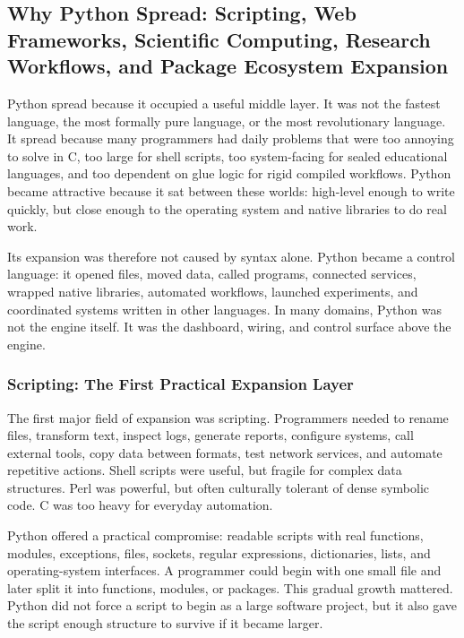 \subsection{Why Python Spread: Scripting, Web Frameworks, Scientific Computing, Research Workflows, and Package Ecosystem Expansion}

Python spread because it occupied a useful middle layer. It was not the fastest language, the most formally pure language, or the most revolutionary language. It spread because many programmers had daily problems that were too annoying to solve in C, too large for shell scripts, too system-facing for sealed educational languages, and too dependent on glue logic for rigid compiled workflows. Python became attractive because it sat between these worlds: high-level enough to write quickly, but close enough to the operating system and native libraries to do real work.

Its expansion was therefore not caused by syntax alone. Python became a control language: it opened files, moved data, called programs, connected services, wrapped native libraries, automated workflows, launched experiments, and coordinated systems written in other languages. In many domains, Python was not the engine itself. It was the dashboard, wiring, and control surface above the engine.

\subsubsection{Scripting: The First Practical Expansion Layer}

The first major field of expansion was scripting. Programmers needed to rename files, transform text, inspect logs, generate reports, configure systems, call external tools, copy data between formats, test network services, and automate repetitive actions. Shell scripts were useful, but fragile for complex data structures. Perl was powerful, but often culturally tolerant of dense symbolic code. C was too heavy for everyday automation.

Python offered a practical compromise: readable scripts with real functions, modules, exceptions, files, sockets, regular expressions, dictionaries, lists, and operating-system interfaces. A programmer could begin with one small file and later split it into functions, modules, or packages. This gradual growth mattered. Python did not force a script to begin as a large software project, but it also gave the script enough structure to survive if it became larger.

